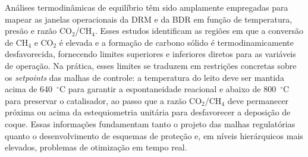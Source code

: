 Análises termodinâmicas de equilíbrio têm sido amplamente empregadas para
mapear as janelas operacionais da DRM e da BDR em função de temperatura,
presão e razão CO\(_2\)/CH\(_4\).\citep{thermodynamics2025,lavoie2014} Esses
estudos identificam as regiões em que a conversão de CH\(_4\) e CO\(_2\) é
elevada e a formação de carbono sólido é termodinamicamente desfavorecida,
fornecendo limites superiores e inferiores diretos para as variáveis de
operação.\citep{thermodynamics2025} Na prática, esses limites se traduzem em
restrições concretas sobre os \emph{setpoints} das malhas de controle:
a temperatura do leito deve ser mantida acima de 640~\(^\circ\)C para garantir
a espontaneidade reacional e abaixo de 800~\(^\circ\)C para preservar o
catalisador, ao passo que a razão CO\(_2\)/CH\(_4\) deve permanecer próxima
ou acima da estequiometria unitária para desfavorecer a deposição de
coque.\citep{thermodynamics2025,lavoie2014} Essas informações fundamentam
tanto o projeto das malhas regulatórias quanto o desenvolvimento de esquemas
de proteção e, em níveis hierárquicos mais elevados, problemas de
otimização em tempo real.\citep{thermodynamics2025}
